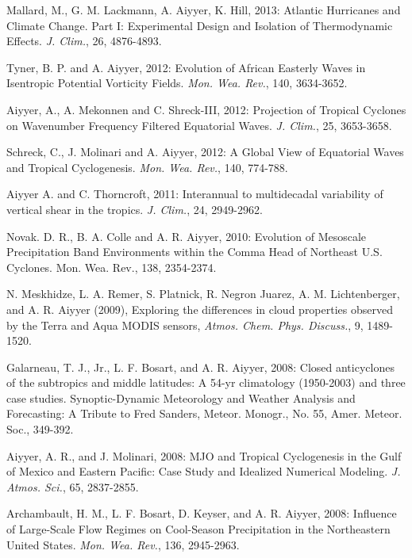 \begin{ilist}
\item Mallard, M., G. M. Lackmann, A. Aiyyer, K. Hill, 2013: Atlantic Hurricanes and Climate Change. Part I: Experimental Design and Isolation of Thermodynamic Effects. \emph{J. Clim.}, 26, 4876-4893.

\item Tyner, B. P. and A. Aiyyer, 2012: Evolution of African Easterly Waves in Isentropic Potential Vorticity Fields. \emph{Mon. Wea. Rev.}, 140, 3634-3652.

\item Aiyyer, A., A. Mekonnen and C. Shreck-III, 2012: Projection of Tropical Cyclones on Wavenumber Frequency Filtered Equatorial Waves. \emph{J. Clim.}, 25, 3653-3658.

\item Schreck, C., J. Molinari and A. Aiyyer, 2012: A Global View of Equatorial Waves and Tropical Cyclogenesis. \emph{Mon. Wea. Rev.}, 140, 774-788.


\item Aiyyer A. and C. Thorncroft, 2011: Interannual to multidecadal variability of vertical shear in the tropics. \emph{J. Clim.}, 24, 2949-2962.

\item Novak. D. R., B. A. Colle and A. R. Aiyyer, 2010: Evolution of Mesoscale Precipitation Band Environments within the Comma Head of Northeast U.S. Cyclones. Mon. Wea. Rev., 138, 2354-2374. 

\item N. Meskhidze, L. A. Remer, S. Platnick, R. Negron Juarez, A. M. Lichtenberger, and A. R. Aiyyer (2009), Exploring the differences in cloud properties observed by the Terra and Aqua MODIS sensors, \emph{Atmos. Chem. Phys. Discuss.}, 9, 1489-1520.

\item Galarneau, T. J., Jr., L. F. Bosart, and A. R. Aiyyer, 2008: Closed anticyclones of the subtropics and middle latitudes: A 54-yr climatology (1950-2003) and three case studies. Synoptic-Dynamic Meteorology and Weather Analysis and Forecasting: A Tribute to Fred Sanders, Meteor. Monogr., No. 55, Amer. Meteor. Soc., 349-392.

\item Aiyyer, A. R., and J. Molinari, 2008: MJO and Tropical Cyclogenesis in the Gulf of Mexico and Eastern Pacific: Case Study and Idealized Numerical Modeling. \emph{J. Atmos. Sci.}, 65, 2837-2855. 

\item Archambault, H. M., L. F. Bosart, D. Keyser, and A. R. Aiyyer, 2008: Influence of Large-Scale Flow Regimes on Cool-Season Precipitation in the Northeastern United States. \emph{Mon. Wea. Rev.}, 136, 2945-2963. 


\end{ilist}
